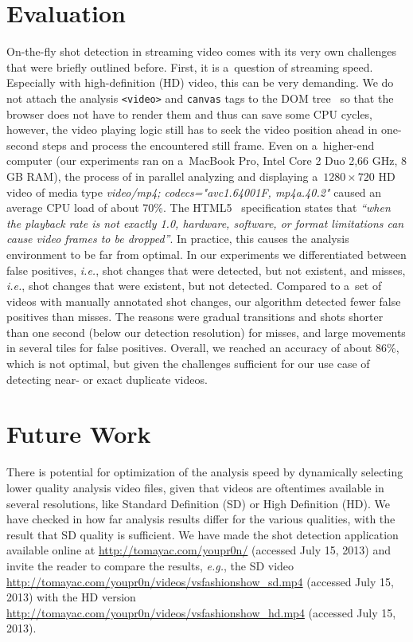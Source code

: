 \section{Evaluation}

On-the-fly shot detection in streaming video
comes with its very own challenges that were briefly outlined before.
First, it is a~question of streaming speed.
Especially with high-definition (HD) video,
this can be very demanding.
We do not attach the analysis \texttt{<video>} and \texttt{canvas} tags
to the DOM tree~\cite{lehors2004dom} so that the browser
does not have to render them and thus can save some CPU cycles,
however, the video playing logic still has to seek the video position
ahead in one-second steps and process the encountered still frame.
Even on a~higher-end computer (our experiments ran on a~MacBook
Pro, Intel Core 2 Duo 2,66 GHz, 8 GB RAM),
the process of in parallel analyzing and displaying
a~$\mathit{1280} \times \mathit{720}$ HD video of media type
\emph{video/mp4; codecs="avc1.64001F, mp4a.40.2"}
caused an average CPU load of about 70\%.
The HTML5~\cite{berjon2012html5} specification states that
\textit{``when the playback rate is not exactly 1.0,
hardware, software, or format limitations can cause video frames
to be dropped''}.
In practice, this causes the analysis environment
to be far from optimal.
In our experiments we differentiated between false positives,
\emph{i.e.}, shot changes that were detected,
but not existent, and misses, \emph{i.e.},
shot changes that were existent,
but not detected.
Compared to a~set of videos with manually annotated shot changes,
our algorithm detected fewer false positives than misses.
The reasons were gradual transitions and shots
shorter than one second (below our detection resolution)
for misses, and large movements in several tiles
for false positives.
Overall, we reached an accuracy of about 86\%,
which is not optimal, but given the challenges
sufficient for our use case of
detecting near- or exact duplicate videos. 

\section{Future Work}

There is potential for optimization of the analysis speed
by dynamically selecting lower quality analysis video files,
given that videos are oftentimes available in several resolutions,
like Standard Definition (SD) or High Definition (HD).
We have checked in how far analysis results differ
for the various qualities,
with the result that SD quality is sufficient.
We have made the shot detection application available online at
\url{http://tomayac.com/youpr0n/} (accessed July 15, 2013) and invite the reader to compare
the results, \emph{e.g.}, the SD video
\url{http://tomayac.com/youpr0n/videos/vsfashionshow_sd.mp4} (accessed July 15, 2013) with
the HD version \url{http://tomayac.com/youpr0n/videos/vsfashionshow_hd.mp4} (accessed July 15, 2013).

